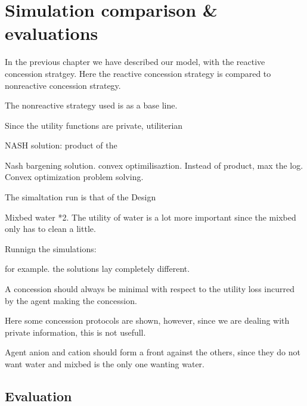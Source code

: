 \chapter{Simulation comparison \& evaluations}
In the previous chapter we have described our model, with the reactive concession stratgey. Here the reactive concession strategy is compared to nonreactive concession strategy. 

The nonreactive strategy used is as a base line.

Since the utility functions are private, utiliterian 

NASH solution:
product of the 

Nash bargening solution. 
convex optimilisaztion. Instead of product, max the log.
Convex optimization problem solving. 

The simaltation run is that of the Design

Mixbed water *2. The utility of water is a lot more important since the mixbed only has to clean a little.

Runnign the simulations:

for example. the solutions lay completely different. 


\citet{endriss2006monotonic} A concession should always be minimal with respect to the utility loss incurred by the agent making the concession.

\citet{endriss2006monotonic} Here some concession protocols are shown,  however, since we are dealing with private information, this is not usefull. 


Agent anion and cation should form a front against the others, since they do not want water and mixbed is the only one wanting water.





















\section{Evaluation}


